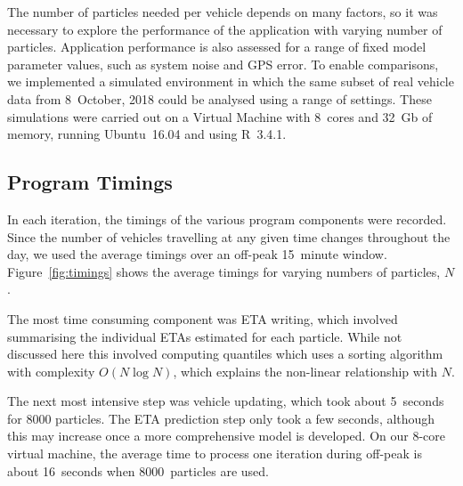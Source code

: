 The number of particles needed per vehicle 
depends on many factors,
so it was necessary to explore the performance of the application
with varying number of particles.
Application performance is also assessed
for a range of fixed model parameter values,
such as system noise and GPS error.
To enable comparisons, we implemented a simulated \rt environment
in which the same subset of real vehicle data from 8~October, 2018
could be analysed using a range of settings.
These simulations were carried out on a Virtual Machine 
with 8~cores and 32~Gb of memory, 
running Ubuntu~16.04 and using R~3.4.1.


\subsection{Program Timings}
\label{sec:timings}

In each iteration, 
the timings of the various program components were recorded.
Since the number of vehicles travelling at any given time changes throughout the day,
we used the average timings over an off-peak 15~minute window.
Figure~\ref{fig:timings} shows the average timings for 
varying numbers of particles, $N$.


The most time consuming component was ETA writing,
which involved summarising the individual ETAs estimated for each particle.
While not discussed here this involved computing quantiles which uses a sorting algorithm
with complexity $O(N \log N)$,
which explains the non-linear relationship with $N$.


The next most intensive step was vehicle updating,
which took about 5~seconds for 8000 particles.
The ETA prediction step only took a few seconds,
although this may increase once a more comprehensive model is developed.
On our 8-core virtual machine,
the average time to process one iteration during off-peak is about 16~seconds
when 8000~particles are used.


